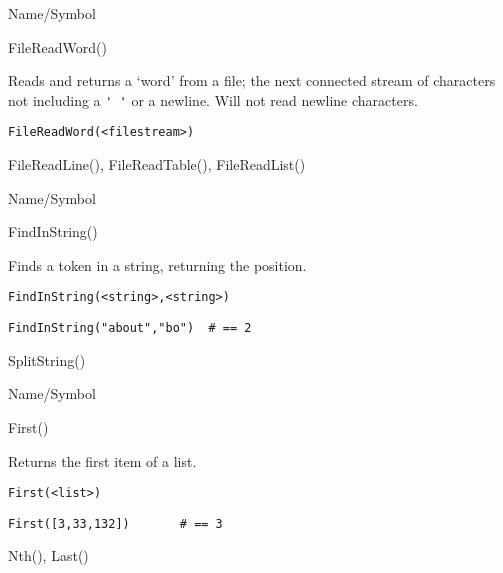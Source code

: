 \begin{desc}{Name/Symbol}
\item[Name/Symbol]	FileReadWord()

\item[Description]	Reads and returns  a `word' from a file; the next
		connected stream of characters not including a \verb+' '+
		or a newline. Will not read newline characters.

\item[Usage]
\begin{verbatim}
FileReadWord(<filestream>)
\end{verbatim}

\item[Example]	

\item[See Also]	FileReadLine(), FileReadTable(), FileReadList()
\end{desc}

\rl




\begin{desc}{Name/Symbol}
\item[Name/Symbol]	FindInString()

\item[Description]	Finds a token in a string, returning the position.

\item[Usage]
\begin{verbatim}
FindInString(<string>,<string>)
\end{verbatim}

\item[Example]
\begin{verbatim}
FindInString("about","bo") 	# == 2
\end{verbatim}

\item[See Also]	SplitString()
\end{desc}

\rl




\begin{desc}{Name/Symbol}
\item[Name/Symbol]	First()

\item[Description]	Returns the first item of a list.

\item[Usage]
\begin{verbatim}
First(<list>)
\end{verbatim}

\item[Example]
\begin{verbatim}
First([3,33,132])		# == 3
\end{verbatim}

\item[See Also]	Nth(), Last()
\end{desc}

